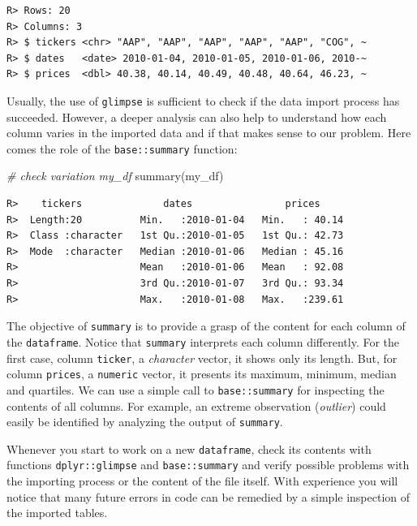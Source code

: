 \documentclass[
  12pt,
]{book}
\newenvironment{Shaded}{\begin{snugshade}}{\end{snugshade}}
\newcommand{\CommentTok}[1]{\textcolor[rgb]{0.37,0.37,0.37}{\textit{#1}}}
\newcommand{\FunctionTok}[1]{\textcolor[rgb]{0,0,0}{#1}}
\newcommand{\NormalTok}[1]{#1}
\newenvironment{rmdimportant}
{\begin{importantblock}
		
	} {\end{importantblock}}
\begin{document}
\begin{verbatim}
R> Rows: 20
R> Columns: 3
R> $ tickers <chr> "AAP", "AAP", "AAP", "AAP", "AAP", "COG", ~
R> $ dates   <date> 2010-01-04, 2010-01-05, 2010-01-06, 2010-~
R> $ prices  <dbl> 40.38, 40.14, 40.49, 40.48, 40.64, 46.23, ~
\end{verbatim}

Usually, the use of \texttt{glimpse} is sufficient to check if the data import process has succeeded. However, a deeper analysis can also help to understand how each column varies in the imported data and if that makes sense to our problem. Here comes the role of the \texttt{base::summary} function:

\begin{Shaded}
\begin{Highlighting}[]
\CommentTok{\# check variation my\_df}
\FunctionTok{summary}\NormalTok{(my\_df)}
\end{Highlighting}
\end{Shaded}

\begin{verbatim}
R>    tickers              dates                prices      
R>  Length:20          Min.   :2010-01-04   Min.   : 40.14  
R>  Class :character   1st Qu.:2010-01-05   1st Qu.: 42.73  
R>  Mode  :character   Median :2010-01-06   Median : 45.16  
R>                     Mean   :2010-01-06   Mean   : 92.08  
R>                     3rd Qu.:2010-01-07   3rd Qu.: 93.34  
R>                     Max.   :2010-01-08   Max.   :239.61
\end{verbatim}

The objective of \texttt{summary} is to provide a grasp of the content for each column of the \texttt{dataframe}. Notice that \texttt{summary} interprets each column differently. For the first case, column \texttt{ticker}, a \emph{character} vector, it shows only its length. But, for column \texttt{prices}, a \texttt{numeric} vector, it presents its maximum, minimum, median and quartiles. We can use a simple call to \texttt{base::summary} for inspecting the contents of all columns. For example, an extreme observation (\emph{outlier}) could easily be identified by analyzing the output of \texttt{summary}.

\begin{rmdimportant}
Whenever you start to work on a new \texttt{dataframe}, check its
contents with functions \texttt{dplyr::glimpse} and
\texttt{base::summary} and verify possible problems with the importing
process or the content of the file itself. With experience you will
notice that many future errors in code can be remedied by a simple
inspection of the imported tables.
\end{rmdimportant}
\end{document}
